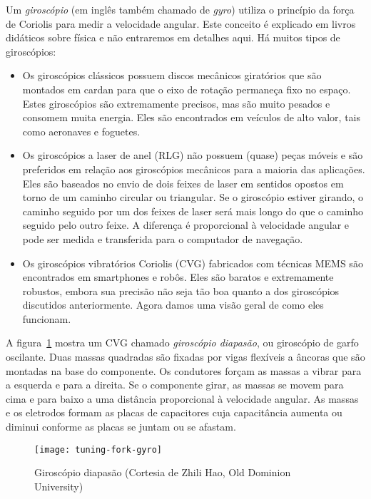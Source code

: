 Um \emph{giroscópio} (em inglês também chamado de \emph{gyro}) utiliza o princípio da força de Coriolis para medir a velocidade angular. Este conceito é explicado em livros didáticos sobre física e não entraremos em detalhes aqui. Há muitos tipos de giroscópios:
\begin{itemize}
\item Os giroscópios clássicos possuem discos mecânicos giratórios que são montados em cardan para que o eixo de rotação permaneça fixo no espaço. Estes giroscópios são extremamente precisos, mas são muito pesados e consomem muita energia. Eles são encontrados em veículos de alto valor, tais como aeronaves e foguetes.
\item Os giroscópios a laser de anel (RLG) não possuem (quase) peças móveis e são preferidos em relação aos giroscópios mecânicos para a maioria das aplicações. Eles são baseados no envio de dois feixes de laser em sentidos opostos em torno de um caminho circular ou triangular. Se o giroscópio estiver girando, o caminho seguido por um dos feixes de laser será mais longo do que o caminho seguido pelo outro feixe. A diferença é proporcional à velocidade angular e pode ser medida e transferida para o computador de navegação.
\item Os giroscópios vibratórios Coriolis (CVG) fabricados com técnicas MEMS são encontrados em smartphones e robôs. Eles são baratos e extremamente robustos, embora sua precisão não seja tão boa quanto a dos giroscópios discutidos anteriormente. Agora damos uma visão geral de como eles funcionam.
\end{itemize}

A figura~\ref{fig.tuning-gyro-image} mostra um CVG chamado \emph{giroscópio diapasão}, ou giroscópio de garfo oscilante. Duas massas quadradas são fixadas por vigas flexíveis a âncoras que são montadas na base do componente. Os condutores forçam as massas a vibrar para a esquerda e para a direita. Se o componente girar, as massas se movem para cima e para baixo a uma distância proporcional à velocidade angular. As massas e os eletrodos formam as placas de capacitores cuja capacitância aumenta ou diminui conforme as placas se juntam ou se afastam.

\begin{figure}
\begin{center}
\texttt{[image: tuning-fork-gyro]}
\end{center}
\caption{Giroscópio diapasão (Cortesia de Zhili Hao, Old Dominion University)}\label{fig.tuning-gyro-image}
\end{figure}

